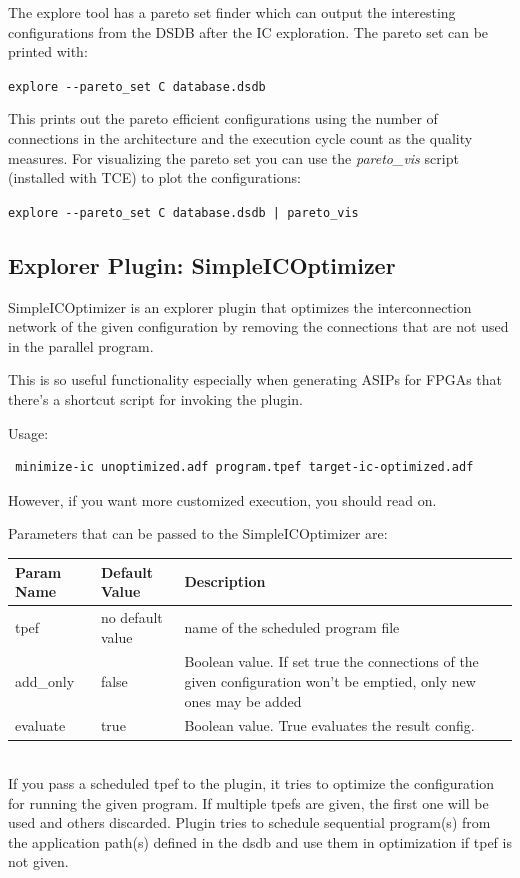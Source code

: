 \documentclass[a4paper,twoside]{tceusermanual}
\begin{document}
The explore tool has a pareto set finder which can output the interesting
configurations from the DSDB after the IC exploration. The pareto set
can be printed with:

\verb|explore --pareto_set C database.dsdb|

This prints out the pareto efficient configurations using the
number of connections in the architecture and the execution cycle count as
the quality measures. For visualizing the pareto set you can use the
\textit{pareto\_vis} script (installed with TCE) to plot the configurations:

\verb#explore --pareto_set C database.dsdb | pareto_vis#

\subsection{Explorer Plugin: SimpleICOptimizer}

SimpleICOptimizer is an explorer plugin that optimizes the interconnection
network of the given configuration by removing the connections that are not
used in the parallel program. 

This is so useful functionality especially when generating ASIPs for
FPGAs that there's a shortcut script for invoking the plugin.

Usage: 
\begin{verbatim}
 minimize-ic unoptimized.adf program.tpef target-ic-optimized.adf
\end{verbatim}

However, if you want more customized execution, you should read on.

Parameters that can be passed to the
SimpleICOptimizer are:

\begin{tabular}{p{}p{}
                p{}}
\textbf{Param Name} &\textbf{Default Value} &\textbf{Description} \\
\hline
tpef & no default value &  name of the scheduled program file \\
add\_only & false &  Boolean value. If set true the connections of the given 
configuration won't be emptied, only new ones may be added\\
evaluate & true &  Boolean value. True evaluates the result config. \\
\end{tabular}\\

If you pass a scheduled tpef to the plugin, it tries to optimize the configuration
for running the given program. If multiple tpefs are given, the first one will be used
and others discarded.
Plugin tries to schedule sequential program(s) from the application path(s) defined in
the dsdb and use them in optimization if tpef is not given.
\end{document}
